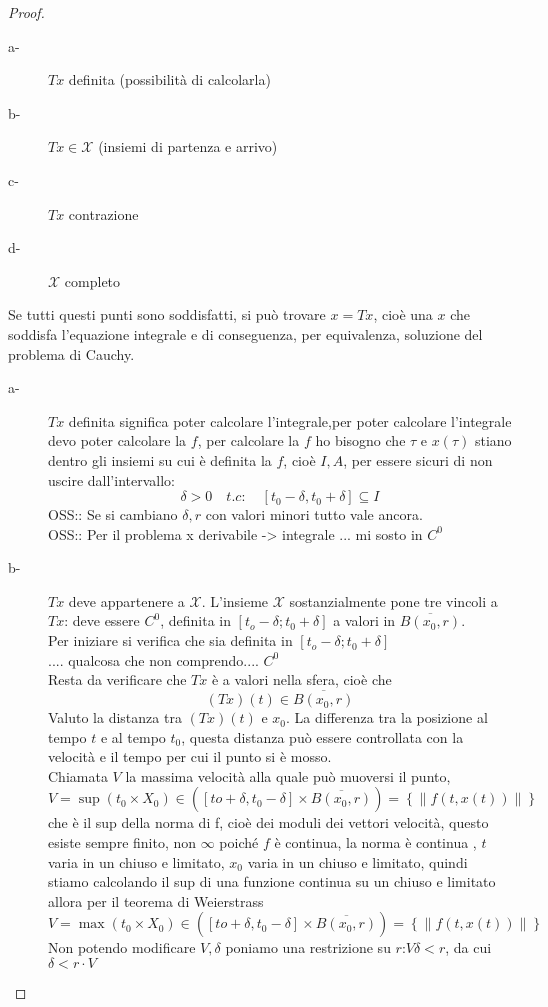 \begin{proof}
\begin{description}
		\item[a-] $Tx$ definita (possibilità di calcolarla)
		\item[b-] $Tx\in\mathcal{X}$ (insiemi di partenza e arrivo)
		\item[c-] $Tx$ contrazione
		\item[d-] $\mathcal{X}$ completo
	\end{description}
	Se tutti questi punti sono soddisfatti, si può trovare $x=Tx$, cioè una $x$ che soddisfa l'equazione integrale e di conseguenza, per equivalenza, soluzione del problema di Cauchy.  
	\begin{description}
		\item[a-] $Tx$ definita significa poter calcolare l'integrale,per poter calcolare l'integrale devo poter calcolare la $f$, per calcolare la $f$ ho bisogno che $\tau$ e $x(\tau)$ stiano dentro gli insiemi su cui è definita la $f$, cioè $I,A$, per essere sicuri di non uscire dall'intervallo:
		$$\delta>0\quad t.c:\quad \left[t_0-\delta,t_0+\delta\right]\subseteq I$$
		OSS:: Se si cambiano $\delta, r$ con valori minori tutto vale ancora.\\
		OSS:: Per il problema x derivabile -> integrale  ... mi sosto in $C^0$
		\item[b-] $Tx$ deve appartenere a $\mathcal{X}$. L'insieme $\mathcal{X}$ sostanzialmente pone tre vincoli a $Tx$: deve essere $C^0$, definita in $\left[t_o-\delta;t_0+\delta\right]$ a valori in $\overline{B(x_0,r)}$.\\
		Per iniziare si verifica che sia definita in $\left[t_o-\delta;t_0+\delta\right]$\\
		.... qualcosa che non comprendo.... $C^0$\\
		Resta da verificare che $Tx$ è a valori nella sfera, cioè che 
		$$(Tx)(t) \in \overline{B(x_0,r)}$$
		Valuto la distanza tra $(Tx)(t)$ e $x_0$. La differenza tra la posizione al tempo $t$ e al tempo $t_0$, questa distanza può essere controllata con la velocità e il tempo per cui il punto si è mosso.\\
		Chiamata $V$ la massima velocità alla quale può muoversi il punto, $V=\sup\limits{(t_0\times X_0)\in (\left[to+\delta,t_0-\delta\right]\times\overline{B(x_0,r)})}=\left\{\left\|f(t,x(t))\right\|\right\}$ che è il sup della norma di f, cioè dei moduli dei vettori velocità, questo esiste sempre finito, non $\infty$ poiché $f$ è continua, la norma è continua , $t$ varia in un chiuso e limitato, $x_0$ varia in un chiuso e limitato, quindi stiamo calcolando  il sup di una funzione continua su un chiuso e limitato allora per il teorema di Weierstrass $V=\max\limits{(t_0\times X_0)\in (\left[to+\delta,t_0-\delta\right]\times\overline{B(x_0,r)})}=\left\{\left\|f(t,x(t))\right\|\right\}$\\
		Non potendo modificare $V, \delta$ poniamo una restrizione su $r$:$V\delta < r$, da cui $\delta < r\cdot V$
		

\end{description}
\end{proof}
